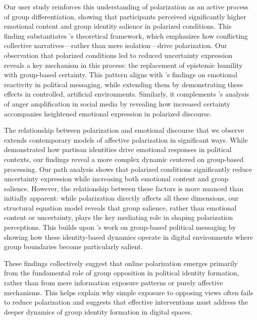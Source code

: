 Our user study reinforces this understanding of polarization as an active process of group differentiation, showing that participants perceived significantly higher emotional content and group identity salience in polarized conditions. This finding substantiates \citep{bliuc_online_2021}'s theoretical framework, which emphasizes how conflicting collective narratives---rather than mere isolation---drive polarization. Our observation that polarized conditions led to reduced uncertainty expression reveals a key mechanism in this process: the replacement of epistemic humility with group-based certainty. This pattern aligns with \citep{mason_cross-cutting_2016}'s findings on emotional reactivity in political messaging, while extending them by demonstrating these effects in controlled, artificial environments. Similarly, it complements \citep{fischer_emotion_2023}'s analysis of anger amplification in social media by revealing how increased certainty accompanies heightened emotional expression in polarized discourse.

The relationship between polarization and emotional discourse that we observe extends contemporary models of affective polarization in significant ways. While \citep{iyengar_fear_2015} demonstrated how partisan identities drive emotional responses in political contexts, our findings reveal a more complex dynamic centered on group-based processing. Our path analysis shows that polarized conditions significantly reduce uncertainty expression while increasing both emotional content and group salience. However, the relationship between these factors is more nuanced than initially apparent: while polarization directly affects all these dimensions, our structural equation model reveals that group salience, rather than emotional content or uncertainty, plays the key mediating role in shaping polarization perceptions. This builds upon \citep{albertson_dog-whistle_2015}'s work on group-based political messaging by showing how these identity-based dynamics operate in digital environments where group boundaries become particularly salient.

These findings collectively suggest that online polarization emerges primarily from the fundamental role of group opposition in political identity formation, rather than from mere information exposure patterns or purely affective mechanisms. This helps explain why simple exposure to opposing views often fails to reduce polarization \citep{bail_exposure_2018} and suggests that effective interventions must address the deeper dynamics of group identity formation in digital spaces.

